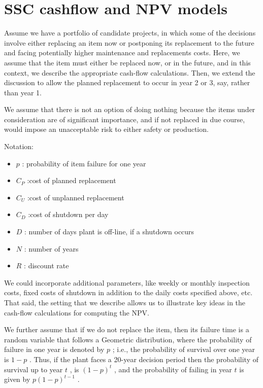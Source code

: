 \section{SSC cashflow and NPV models}
\label{sec:SSCNPV}

Assume we have a portfolio of candidate projects, in which some of the decisions involve either replacing an item now or postponing its replacement to the future and facing potentially higher maintenance and replacements costs. Here, we assume that the item must either be replaced now, or in the future, and in this context, we describe the appropriate cash-flow calculations. Then, we extend the discussion to allow the planned replacement to occur in year 2 or 3, say, rather than year 1.

We assume that there is not an option of doing nothing because the items under consideration are of significant importance, and if not replaced in due course, would impose an unacceptable risk to either safety or production.

Notation:

\begin{itemize}
	\item  \( p \) : probability of item failure for one year

	\item  \( C_{P} \) :cost of planned replacement

	\item  \( C_{U} \) :cost of unplanned replacement

	\item  \( C_{D} \) :cost of shutdown per day

	\item  \( D \) : number of days plant is off-line, if a shutdown occurs

	\item  \( N \) : number of years

	\item  \( R \) : discount rate
\end{itemize}


We could incorporate additional parameters, like weekly or monthly inspection costs, fixed costs of shutdown in addition to the daily costs specified above, etc. That said, the setting that we describe allows us to illustrate key ideas in the cash-flow calculations for computing the NPV.

We further assume that if we do not replace the item, then its failure time is a random variable that follows a Geometric distribution, where the probability of failure in one year is denoted by  \( p \) ; i.e., the probability of survival over one year is  \( 1-p \) . Thus, if the plant faces a 20-year decision period then the probability of survival up to year  \( t \) , is  \(  \left( 1-p \right) ^{t} \) , and the probability of failing in year  \( t \)  is given by  \( p \left( 1-p \right) ^{t-1} \) .

